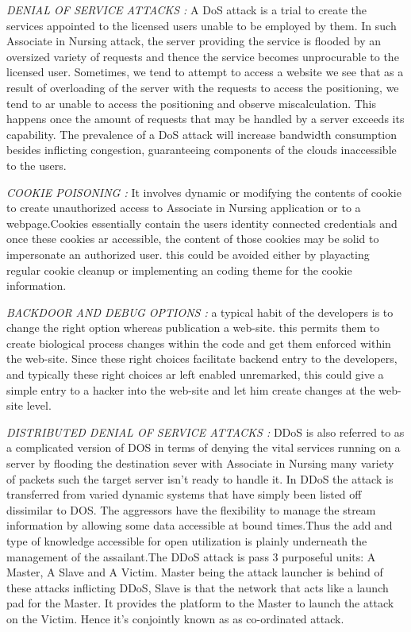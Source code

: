 \textit{DENIAL OF SERVICE ATTACKS :}
A DoS attack is a trial to create the services appointed to the licensed users unable to be employed by them. In such Associate in Nursing attack, the server providing the service is flooded by an oversized variety of requests and thence the service becomes unprocurable to the licensed user.
Sometimes, we tend to attempt to access a website we see that as a
result of overloading of the server with the requests to access the positioning, we tend to ar unable to access the positioning and observe miscalculation. This happens once the amount of requests that may be handled by a server exceeds its capability. The prevalence of a DoS attack will increase bandwidth consumption besides inflicting congestion, guaranteeing components of the clouds inaccessible to
the users.

\textit{COOKIE POISONING :}
It involves dynamic or modifying the contents of cookie to create unauthorized
access to Associate in Nursing application or to a webpage.Cookies essentially
contain the users identity connected credentials and once these cookies ar accessible, the content of those cookies may be solid to impersonate an authorized user. this could be avoided either by playacting regular cookie cleanup or implementing an coding theme for the cookie information.

\textit{BACKDOOR AND DEBUG OPTIONS :} a typical habit of the developers is to change
the right option whereas publication a web-site. this permits them to create biological process changes within the code and get them enforced within the web-site. Since these right choices facilitate backend entry to the developers, and typically these right choices ar left enabled unremarked, this could give a simple
entry to a hacker into the web-site and let him create changes at the web-site level.

\textit{DISTRIBUTED DENIAL OF SERVICE ATTACKS :} DDoS is also referred to as a
complicated version of DOS in terms of denying the vital services running on a server by flooding the destination sever with Associate in Nursing many variety of packets such the target server isn't ready to handle it. In DDoS the attack is transferred from varied dynamic systems that have simply been listed off dissimilar to DOS. The aggressors have the flexibility to manage the stream information by allowing some data accessible at bound times.Thus the add and type of knowledge accessible for open utilization is plainly underneath the management of the
assailant.The DDoS attack is pass 3 purposeful units: A Master, A Slave and A Victim. Master being the attack launcher is behind of these attacks inflicting DDoS, Slave is that the network that acts like a launch pad for the Master. It provides the platform to the Master to launch the attack on the Victim.
Hence it's conjointly known as as co-ordinated attack.

